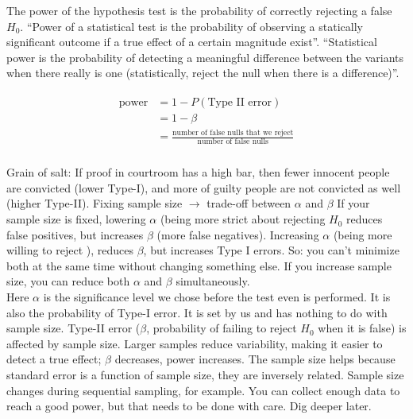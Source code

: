 \vspace{.15in}
\begin{deff}
The power of the hypothesis test is the probability of correctly rejecting a false $H_0$. 
``Power of a statistical test is the probability of observing a statically significant 
outcome if a true effect of a certain magnitude exist''\cite{georgiev2019}.
``Statistical power is the probability of detecting a meaningful difference
between the variants when there really is one (statistically, reject the null when
there is a difference)''\cite{kohavi2020trustworthy}.

\begin{gather} %
\begin{aligned}
\text{power} &=  1 - P(\text{Type II error})\\
                   &= 1 - \beta \\
                   &=  \frac{\text{number of false nulls that we reject}}{\text{number of false nulls}}\\
\end{aligned}
\end{gather} 
\end{deff}

Grain of salt:
If proof in courtroom has a high bar, then fewer innocent people are convicted (lower Type-I), and more of guilty people are not convicted as well (higher Type-II).
Fixing sample size $\rightarrow$ trade-off between $\alpha$ and $\beta$
If your sample size is fixed, lowering $\alpha$ (being more strict about rejecting $H_0$ reduces false positives, but increases $\beta$ (more false negatives).
Increasing $\alpha$ (being more willing to reject ), reduces $\beta$, but increases Type I errors.
So: you can’t minimize both at the same time without changing something else.
If you increase sample size, you can reduce both $\alpha$ and $\beta$ simultaneously.\\

Here $\alpha$ is the significance level we chose before
the test even is performed. It is also the probability of Type-I error.
It is set by us and has nothing to do with sample size.
Type-II error ($\beta$, probability of failing to reject $H_0$ when it is false)
is affected by sample size. 
Larger samples reduce variability, making it easier to detect a true effect; $\beta$ decreases, power increases. The sample size helps because standard error is a function of sample
size, they are inversely related. 
Sample size changes during sequential sampling, for example.
You can collect enough data to reach a good power, but that needs
to be done with care. Dig deeper later.

